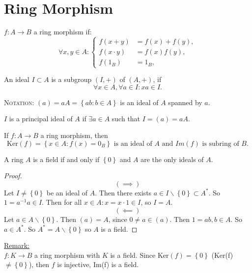  \section{Ring Morphism}
 \begin{definition}[]
 $ f : A \longrightarrow B $ a ring morphism if:
 \[
 \forall x,y \in  A: \begin{cases}
   f(x + y)  &= f(x)  + f(y),  \\
   f(x \cdot  y) &= f(x)  f(y),  \\
   f(1_{B}) &= 1_{B},
 \end{cases}
 \]
 \end{definition}
 \begin{definition}[Ideals]
 An ideal $I \subset A$ is a subgroup $(I, +) $ of $(A, +) $, if
 \[
 \forall x \in  A, \forall a \in  I: xa \in  I.
 \]
 \end{definition}
\noindent {} \textsc{Notation:} 
$(a)  = a A = \left\{ ab: b \in  A \right\}$ is 
an ideal of $A$ spanned by $a.$ 
\begin{definition}[]
$I$ is a principal ideal 
of $A$ if $\exists  a \in  A$ such that 
$I = (a)  = aA$.
\end{definition}
\begin{example}
If $ f : A \longrightarrow B $ a ring morphism, then 
\[
\text{Ker}  (f)  = 
\left\{ x \in   A: f(x)  = 0_{B} \right\} \text{ is an ideal of $A$ and $Im(f) $ is subring of $B$.}  
\]
\end{example}
\begin{proposition}[]
A ring $A$ is a field if and only if $\left\{ 0 \right\}$ and $A$ are the only ideals of $A$.
\end{proposition}
\begin{proof}
  \[
    ( \implies ) 
  \]
Let $I \neq \left\{ 0 \right\}$ be an ideal of $A$. Then there exists $a \in  I \backslash  \left\{ 0 \right\} 
\subset A^{*}$. So $1 = a ^{-1} a \in  I $. Then for all $x \in   A: x = x \cdot  1 \in  I$, so $I = A.$ 
\[
  ( \impliedby ) 
\]
Let $a \in  A \backslash  \left\{ 0 \right\}$. Then $(a)  = A$, since $0 \neq a \in  (a) $. Then 
$1 = ab, b \in  A$. So $a \in  A^{*}$. So $A^{*} = A \backslash  \left\{ 0 \right\}$ so $A$ is a field.
\end{proof}
\noindent
\textcolor{larratBicep!50!brown}{
\underline{
Remark:
}
}\\
$ f : K \longrightarrow B $ a ring morphism with $K$ is a field. Since $\text{Ker}  (f)  = \left\{ 0 \right\}$ (Ker(f) 
$\neq \left\{ 0 \right\}$), then $f$ is injective, Im(f) is a field.
